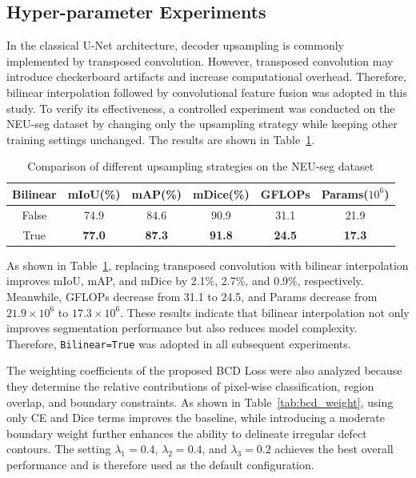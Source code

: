 \documentclass[sn-basic]{sn-jnl}
\theoremstyle{thmstyleone}%
\theoremstyle{thmstyletwo}%
\theoremstyle{thmstylethree}%
\begin{document}
\subsection{Hyper-parameter Experiments}
In the classical U-Net architecture, decoder upsampling is commonly implemented by transposed convolution. However, transposed convolution may introduce checkerboard artifacts and increase computational overhead. Therefore, bilinear\cite{Sahoo2025Bilinear} interpolation followed by convolutional feature fusion was adopted in this study. To verify its effectiveness, a controlled experiment was conducted on the NEU-seg dataset by changing only the upsampling strategy while keeping other training settings unchanged. The results are shown in Table~\ref{tab:bilinear}.

\begin{table}[htbp]
\caption{Comparison of different upsampling strategies on the NEU-seg dataset}
\label{tab:bilinear}
\centering
\begin{tabular}{cccccc}
\toprule
Bilinear & mIoU(\%) & mAP(\%) & mDice(\%) & GFLOPs & Params($10^6$) \\
\midrule
False & 74.9 & 84.6 & 90.9 & 31.1 & 21.9 \\
True & \textbf{77.0} & \textbf{87.3} & \textbf{91.8} & \textbf{24.5} & \textbf{17.3} \\
\bottomrule
\end{tabular}
\end{table}

As shown in Table~\ref{tab:bilinear}, replacing transposed convolution with bilinear interpolation improves mIoU, mAP, and mDice by 2.1\%, 2.7\%, and 0.9\%, respectively. Meanwhile, GFLOPs decrease from 31.1 to 24.5, and Params decrease from $21.9\times10^6$ to $17.3\times10^6$. These results indicate that bilinear interpolation not only improves segmentation performance but also reduces model complexity. Therefore, \texttt{Bilinear=True} was adopted in all subsequent experiments.

The weighting coefficients of the proposed BCD Loss were also analyzed because they determine the relative contributions of pixel-wise classification, region overlap, and boundary constraints. As shown in Table~\ref{tab:bcd_weight}, using only CE and Dice terms improves the baseline, while introducing a moderate boundary weight further enhances the ability to delineate irregular defect contours. The setting $\lambda_1=0.4$, $\lambda_2=0.4$, and $\lambda_3=0.2$ achieves the best overall performance and is therefore used as the default configuration.
\end{document}
